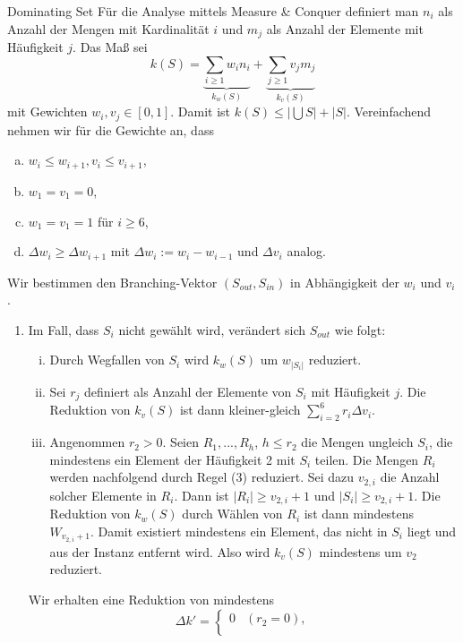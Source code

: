 \begin{section}{Dominating Set}
  Für die Analyse mittels Measure \& Conquer definiert man \(n_i\) als Anzahl der Mengen mit Kardinalität \(i\) und \(m_j\) als Anzahl der Elemente mit Häufigkeit \(j\). Das Maß sei
  \[ k(S) = \underbrace{ \sum_{i \geq 1} w_in_i }_{k_w(S)} + \underbrace{\sum_{j \geq 1} v_jm_j}_{k_v(S)} \]
  mit Gewichten \(w_i, v_j \in [0,1]\). Damit ist \(k(S) \leq |\bigcup S| + |S|\). Vereinfachend nehmen wir für die Gewichte an, dass
  \begin{enumerate}[(a)]
   \item \(w_i \leq w_{i+1}, v_i \leq v_{i+1}\),
   \item \(w_1 = v_1 = 0\),
   \item \(w_1 = v_1 = 1\) für \(i \geq 6\),
   \item \(\Delta w_i \geq \Delta w_{i+1}\) mit \(\Delta w_i := w_i - w_{i-1}\) und \(\Delta v_i\) analog.
  \end{enumerate}
  Wir bestimmen den Branching-Vektor \( (S_{out}, S_{in}) \) in Abhängigkeit der \(w_i\) und \(v_i\).
  \begin{enumerate}[(1)]
   \item Im Fall, dass \(S_i\) nicht gewählt wird, verändert sich \(S_{out}\) wie folgt:
          \begin{enumerate}[(i)]
            \item Durch Wegfallen von \(S_i\) wird \(k_w(S)\) um \(w_{|S_i|}\) reduziert.
            \item Sei \(r_j\) definiert als Anzahl der Elemente von \(S_i\) mit Häufigkeit \(j\). Die Reduktion von \(k_v(S)\) ist dann kleiner-gleich \(\sum_{i=2}^6 r_i \Delta v_i\).
            \item Angenommen \(r_2 > 0\). Seien \(R_1, ..., R_h\), \(h \leq r_2\) die Mengen ungleich \(S_i\), die mindestens ein Element der Häufigkeit 2 mit \(S_i\) teilen. Die Mengen \(R_i\) werden nachfolgend durch Regel (3) reduziert. Sei dazu \(v_{2,i}\) die Anzahl solcher Elemente in \(R_i\). Dann ist \(|R_i| \geq v_{2,i}+1\) und \(|S_i| \geq v_{2,i} + 1\). Die Reduktion von \(k_w(S)\) durch Wählen von \(R_i\) ist dann mindestens \(W_{v_{2,i}+1}\). Damit existiert mindestens ein Element, das nicht in \(S_i\) liegt und aus der Instanz entfernt wird. Also wird \(k_v(S)\) mindestens um \(v_2\) reduziert.
          \end{enumerate}
          Wir erhalten eine Reduktion von mindestens
          \[
           \Delta k' =
           \begin{cases}
             0 & (r_2 = 0), \\

\end{cases}\]
\end{enumerate}
\end{section}
